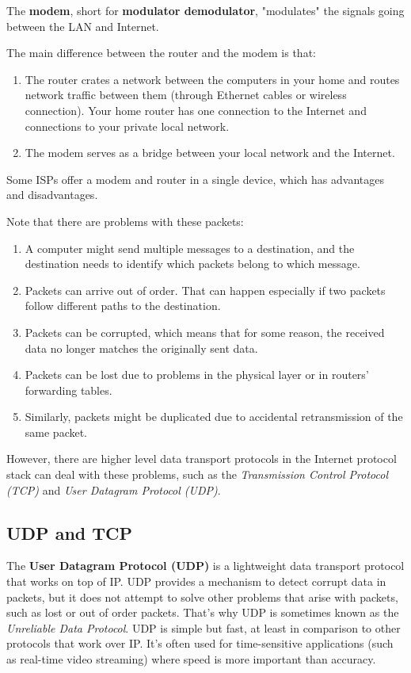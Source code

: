 \documentclass{article}
\newcounter{definition}[section]
\begin{document}
  \begin{definition}[Modem]
    \label{def:modem}
  The \textbf{modem}, short for \textbf{modulator demodulator}, "modulates" the signals going between the LAN and Internet. 
  \end{definition}

  The main difference between the router and the modem is that: 
  \begin{enumerate}
      \item The router crates a network between the computers in your home and routes network traffic between them (through Ethernet cables or wireless connection). Your home router has one connection to the Internet and connections to your private local network. 
      \item The modem serves as a bridge between your local network and the Internet. 
  \end{enumerate}
  Some ISPs offer a modem and router in a single device, which has advantages and disadvantages. 

  Note that there are problems with these packets: 
  \begin{enumerate}
      \item A computer might send multiple messages to a destination, and the destination needs to identify which packets belong to which message.
      \item Packets can arrive out of order. That can happen especially if two packets follow different paths to the destination.
      \item Packets can be corrupted, which means that for some reason, the received data no longer matches the originally sent data.
      \item Packets can be lost due to problems in the physical layer or in routers' forwarding tables.
      \item Similarly, packets might be duplicated due to accidental retransmission of the same packet.
  \end{enumerate}

  However, there are higher level data transport protocols in the Internet protocol stack can deal with these problems, such as the \textit{Transmission Control Protocol (TCP)} and \textit{User Datagram Protocol (UDP)}. 

  \subsection{UDP and TCP}

  The \textbf{User Datagram Protocol (UDP)} is a lightweight data transport protocol that works on top of IP. UDP provides a mechanism to detect corrupt data in packets, but it does not attempt to solve other problems that arise with packets, such as lost or out of order packets. That's why UDP is sometimes known as the \textit{Unreliable Data Protocol}. UDP is simple but fast, at least in comparison to other protocols that work over IP. It's often used for time-sensitive applications (such as real-time video streaming) where speed is more important than accuracy.
\end{document}
